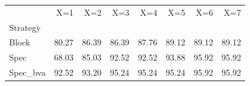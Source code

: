 \begin{tabular}{lrrrrrrr}
\toprule
 & X=1 & X=2 & X=3 & X=4 & X=5 & X=6 & X=7 \\
Strategy &  &  &  &  &  &  &  \\
\midrule
Block & 80.27 & 86.39 & 86.39 & 87.76 & 89.12 & 89.12 & 89.12 \\
Spec & 68.03 & 85.03 & 92.52 & 92.52 & 93.88 & 95.92 & 95.92 \\
Spec_bva & 92.52 & 93.20 & 95.24 & 95.24 & 95.24 & 95.92 & 95.92 \\
\bottomrule
\end{tabular}
